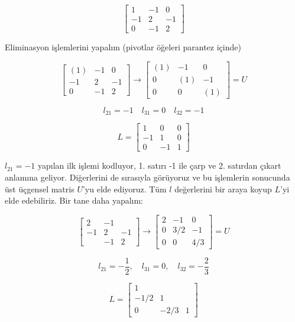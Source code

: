 \documentclass[12pt,fleqn]{article}\usepackage{../../common}
\begin{document}
$$
\left[\begin{array}{rrr}
1 & -1 & 0 \\
-1 & 2 & -1 \\
0 & -1 & 2 
\end{array}\right]
$$

Eliminasyon işlemlerini yapalım (pivotlar öğeleri parantez içinde)

$$
\left[\begin{array}{rrr}
(1) & -1 & 0 \\
-1 & 2 & -1 \\
0 & -1 & 2
\end{array}\right]
\to
\left[\begin{array}{rrr}
(1) & -1 & 0 \\
0 & (1) & -1 \\
0 & 0 & (1)
\end{array}\right] = U
$$

$$ l_{21} = -1 \quad l_{31} = 0 \quad l_{32} = -1 $$

$$
L = \left[\begin{array}{rrr}
1 & 0 & 0 \\ -1 & 1 & 0 \\ 0 & -1 & 1
\end{array}\right]
$$

$l_{21} = -1$ yapılan ilk işlemi kodluyor, 1. satırı -1 ile çarp ve
2. satırdan çıkart anlamına geliyor. Diğerlerini de sırasıyla görüyoruz ve
bu işlemlerin sonucunda üst üçgensel matris $U$'yu elde ediyoruz. Tüm $l$
değerlerini bir araya koyup $L$'yi elde edebiliriz. Bir tane daha yapalım:

$$
\left[\begin{array}{rrr}
2 & -1 & \\ -1 & 2 & -1 \\ & -1 & 2
\end{array}\right]
\to
\left[\begin{array}{rrr}
2 & -1 & 0 \\ 0 & 3/2 & -1 \\ 0 & 0 & 4/3
\end{array}\right] = U
$$

$$ l_{21}=-\frac{1}{2}, \quad
l_{31} = 0, \quad
l_{32} = -\frac{2}{3}
$$

$$ L =
\left[\begin{array}{ccc}
1 &  &  \\ -1/2 & 1 &  \\ 0 & -2/3 & 1
\end{array}\right] 
$$
\end{document}
